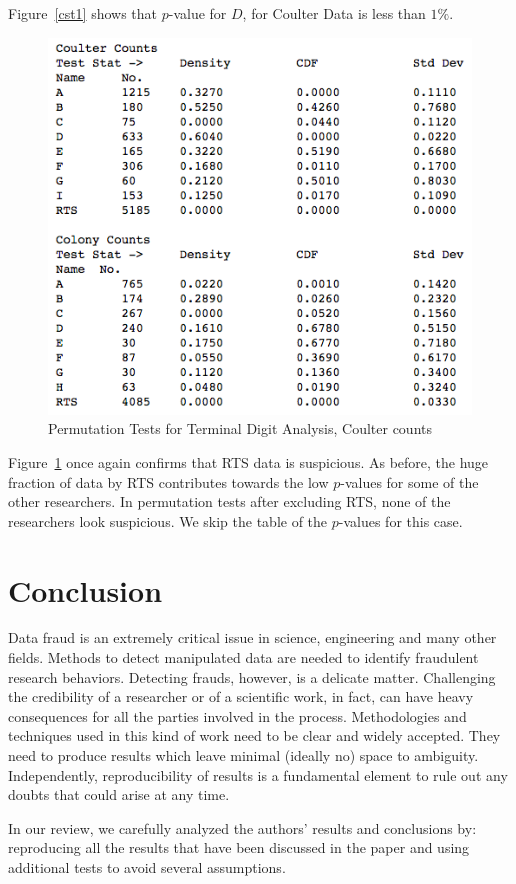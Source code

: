 \documentclass{article}
\begin{document}
Figure~\ref{cst1} shows that $p$-value for $D$, for Coulter Data is less than $1\%$.

\begin{figure}[H]
\centering
\includegraphics[width=0.7\linewidth]{images/raaz_eq_perm_summary.png}
\caption{Permutation Tests for Terminal Digit Analysis, Coulter counts}
\label{perm2}
\end{figure}

Figure~\ref{perm2} once again confirms that RTS data is suspicious. As before, the huge fraction of data
by RTS contributes towards the low $p$-values for some of the other
researchers. In permutation tests after excluding RTS, none of the researchers look suspicious. We skip the table of the $p$-values for this case.

    \section{Conclusion}\label{conclusion}

    Data fraud is an extremely critical issue in science, engineering and
many other fields. Methods to detect manipulated data are needed to
identify fraudulent research behaviors. Detecting frauds, however, is a
delicate matter. Challenging the credibility of a researcher or of a
scientific work, in fact, can have heavy consequences for all the parties
involved in the process. Methodologies and techniques used in this kind
of work need to be clear and widely accepted. They need to produce
results which leave minimal (ideally no) space to ambiguity. Independently, reproducibility of results is a fundamental element to rule out any doubts that could arise at any time.

In our review, we carefully analyzed the authors' results
and conclusions by: reproducing all the results that have been
discussed in the paper and using additional tests to avoid several assumptions.
\end{document}
